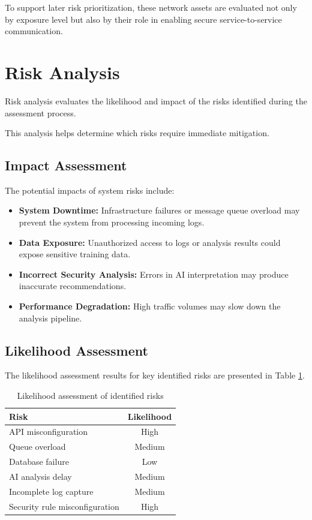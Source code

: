 To support later risk prioritization, these network assets are evaluated not only by exposure level but also by their role in enabling secure service-to-service communication.

\section{Risk Analysis}
Risk analysis evaluates the likelihood and impact of the risks identified during the assessment process.

This analysis helps determine which risks require immediate mitigation.

\subsection{Impact Assessment}
The potential impacts of system risks include:

\begin{itemize}
    \item \textbf{System Downtime:} Infrastructure failures or message queue overload may prevent the system from processing incoming logs.
    \item \textbf{Data Exposure:} Unauthorized access to logs or analysis results could expose sensitive training data.
    \item \textbf{Incorrect Security Analysis:} Errors in AI interpretation may produce inaccurate recommendations.
    \item \textbf{Performance Degradation:} High traffic volumes may slow down the analysis pipeline.
\end{itemize}

\subsection{Likelihood Assessment}
The likelihood assessment results for key identified risks are presented in Table \ref{tab:risk-likelihood-assessment}.

\begin{table}[H]
    \centering
    \renewcommand{\arraystretch}{1.2}
    \begin{tabularx}{0.8\textwidth}{|X|c|}
        \hline
        \textbf{Risk} & \textbf{Likelihood} \\
        \hline
        API misconfiguration & High \\
        \hline
        Queue overload & Medium \\
        \hline
        Database failure & Low \\
        \hline
        AI analysis delay & Medium \\
        \hline
        Incomplete log capture & Medium \\
        \hline
        Security rule misconfiguration & High \\
        \hline
    \end{tabularx}
    \caption{Likelihood assessment of identified risks}
    \label{tab:risk-likelihood-assessment}
\end{table}

